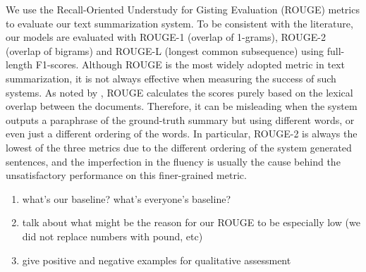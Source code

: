 We use the Recall-Oriented Understudy for Gisting Evaluation (ROUGE) metrics \cite{lin2004rouge} to evaluate our text summarization system. To be consistent with the literature, our models are evaluated with ROUGE-1 (overlap of 1-grams), ROUGE-2 (overlap of bigrams) and ROUGE-L (longest common subsequence) using full-length F1-scores. Although ROUGE is the most widely adopted metric in text summarization, it is not always effective when measuring the success of such systems. As noted by \cite{cohan2016revisiting}, ROUGE calculates the scores purely based on the lexical overlap between the documents. Therefore, it can be misleading when the system outputs a paraphrase of the ground-truth summary but using different words, or even just a different ordering of the words. In particular, ROUGE-2 is always the lowest of the three metrics due to the different ordering of the system generated sentences, and the imperfection in the fluency is usually the cause behind the unsatisfactory performance on this finer-grained metric.


\begin{enumerate}
\item what's our baseline? what's everyone's baseline?
\item talk about what might be the reason for our ROUGE to be especially low (we did not replace numbers with pound, etc)
\item give positive and negative examples for qualitative assessment
\end{enumerate}